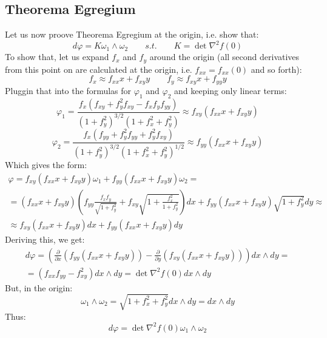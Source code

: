 \documentclass{article}
\begin{document}
\subsection*{Theorema Egregium}
Let us now proove Theorema Egregium at the origin, i.e. show that:
\begin{equation}
    d\varphi = K \omega_1 \wedge \omega_2 \qquad s.t. \qquad K = \det \nabla^2 f(0)
\end{equation}
To show that, let us expand $f_x$ and $f_y$ around the origin (all second derivatives from this point on are calculated at the origin, i.e. $f_{xx} = f_{xx}(0)$ and so forth):
\begin{equation}
    f_x \approx f_{xx}x + f_{xy}y
    \qquad
    f_y \approx f_{xy}x + f_{yy}y
\end{equation}
Pluggin that into the formulas for $\varphi_1$ and $\varphi_2$ and keeping only linear terms:
\begin{equation}
    \varphi_1 = \frac{f_x(f_{xy} + f_y^2f_{xy} - f_xf_yf_{yy})}{\left(1 + f_y^2\right)^{3/2}\left(1 + f_x^2 + f_y^2\right)} \approx
    f_{xy}(f_{xx}x + f_{xy}y)
\end{equation} 
\begin{equation}
    \varphi_2 = \frac{f_x(f_{yy} + f_y^2f_{yy} + f_y^2f_{xy})}{(1 + f_y^2)^{3/2}\left(1 + f_x^2 + f_y^2\right)^{1/2}} \approx
    f_{yy}(f_{xx}x + f_{xy}y)
\end{equation}
Which gives the form:
\begin{equation}
\begin{gathered}
    \varphi = f_{xy}(f_{xx}x + f_{xy}y) \omega_1 + f_{yy}(f_{xx}x + f_{xy}y) \omega_2 = \\ =
    (f_{xx}x + f_{xy}y)\left(f_{yy} \frac{f_xf_y}{\sqrt{1 + f_y^2}} + f_{xy} \sqrt{1 + \frac{f_x^2}{1 + f_y^2}}\right)dx + f_{yy}(f_{xx}x + f_{xy}y)\sqrt{1 + f_y^2}dy \approx \\ \approx
    f_{xy}(f_{xx}x + f_{xy}y)dx + f_{yy}(f_{xx}x + f_{xy}y)dy
\end{gathered}
\end{equation}
Deriving this, we get:
\begin{equation}
\begin{gathered}
    d\varphi = \left(
        \frac{\partial}{\partial x}\left(f_{yy}(f_{xx}x + f_{xy}y)\right) -
        \frac{\partial}{\partial y}\left(f_{xy}(f_{xx}x + f_{xy}y)\right)
    \right) dx \wedge dy = \\ =
    \left(f_{xx}f_{yy} - f_{xy}^2\right) dx \wedge dy = \det \nabla^2 f(0) dx \wedge dy
\end{gathered}
\end{equation}
But, in the origin:
\begin{equation}
    \omega_1 \wedge \omega_2 = \sqrt{1 + f_x^2 + f_y^2} dx \wedge dy = dx \wedge dy
\end{equation}
Thus:
\begin{equation}
    d\varphi = \det \nabla^2 f(0) \omega_1 \wedge \omega_2
\end{equation}
\end{document}
